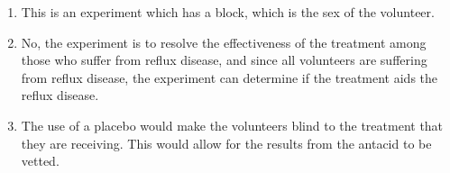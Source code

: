 \documentclass[]{article}
\begin{document}
\begin{enumerate}
\def\labelenumi{\alph{enumi})}
\item
  This is an experiment which has a block, which is the sex of the
  volunteer.
\item
  No, the experiment is to resolve the effectiveness of the treatment
  among those who suffer from reflux disease, and since all volunteers
  are suffering from reflux disease, the experiment can determine if the
  treatment aids the reflux disease.
\item
  The use of a placebo would make the volunteers blind to the treatment
  that they are receiving. This would allow for the results from the
  antacid to be vetted.
\end{enumerate}
\end{document}
